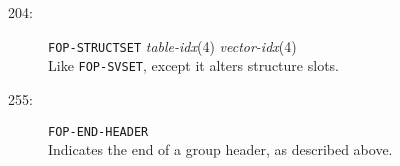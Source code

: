 \begin{description}
\item[204:] \hspace{2em} {\tt FOP-STRUCTSET} \hspace{2em} {\it table-idx}(4)
\hspace{2em} {\it vector-idx}(4)\\
Like {\tt FOP-SVSET}, except it alters structure slots.

\item[255:] \hspace{2em} {\tt FOP-END-HEADER} \\ Indicates the end of a group header,
as described above.
\end{description}
